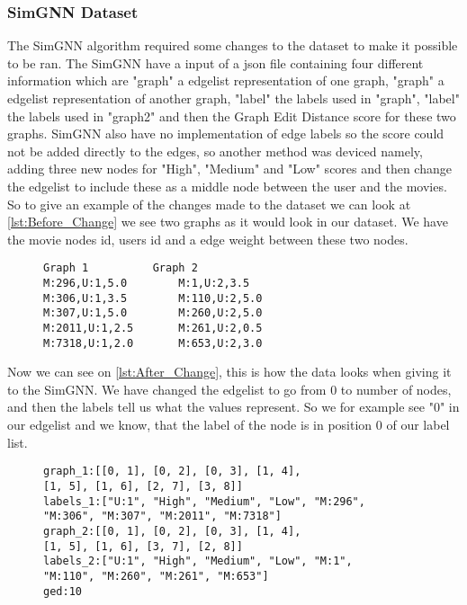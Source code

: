 \subsubsection{SimGNN Dataset}
The SimGNN algorithm required some changes to the dataset to make it possible to be ran. The SimGNN have a input of a json file containing four different information which are "graph" a edgelist representation of one graph, "graph" a edgelist representation of another graph, "label" the labels used in "graph", "label" the labels used in "graph2" and then the Graph Edit Distance score for these two graphs. SimGNN also have no implementation of edge labels so the score could not be added directly to the edges, so another method was deviced namely, adding three new nodes for "High", "Medium" and "Low" scores and then change the edgelist to include these as a middle node between the user and the movies. 
So to give an example of the changes made to the dataset we can look at \autoref{lst:Before_Change} we see two graphs as it would look in our dataset. We have the movie nodes id, users id and a edge weight between these two nodes. 
\begin{figure}\label{lst:Before_Change}
\begin{lstlisting}
Graph 1			 Graph 2
M:296,U:1,5.0		 M:1,U:2,3.5
M:306,U:1,3.5		 M:110,U:2,5.0
M:307,U:1,5.0		 M:260,U:2,5.0
M:2011,U:1,2.5 		 M:261,U:2,0.5
M:7318,U:1,2.0		 M:653,U:2,3.0
\end{lstlisting}
\end{figure}
Now we can see on \autoref{lst:After_Change}, this is how the data looks when giving it to the SimGNN. We have changed the edgelist to go from 0 to number of nodes, and then the labels tell us what the values represent. So we for example see "0" in our edgelist and we know, that the label of the node is in position 0 of our label list.
\begin{figure}\label{lst:After_Change}
\begin{lstlisting}
graph_1:[[0, 1], [0, 2], [0, 3], [1, 4], 
[1, 5], [1, 6], [2, 7], [3, 8]]
labels_1:["U:1", "High", "Medium", "Low", "M:296", 
"M:306", "M:307", "M:2011", "M:7318"]
graph_2:[[0, 1], [0, 2], [0, 3], [1, 4], 
[1, 5], [1, 6], [3, 7], [2, 8]]
labels_2:["U:1", "High", "Medium", "Low", "M:1",
"M:110", "M:260", "M:261", "M:653"]
ged:10
\end{lstlisting}
\end{figure}